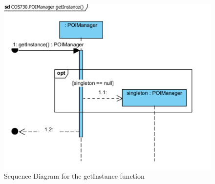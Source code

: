 \begin{figure}[!htb]
\includegraphics[width=\textwidth]{Images/getInstance_Sequence.png}
\caption{Sequence Diagram for the getInstance function}
\end{figure}
